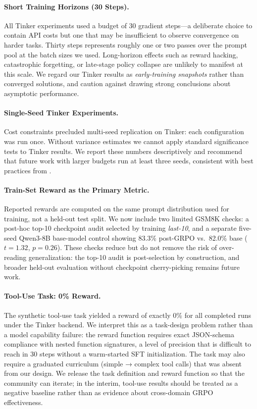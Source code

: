 \documentclass{article}
\begin{document}
\paragraph{Short Training Horizons (30 Steps).}
All Tinker experiments used a budget of 30 gradient steps---a deliberate choice
to contain API costs but one that may be insufficient to observe convergence
on harder tasks. Thirty steps represents roughly one or two passes over the
prompt pool at the batch sizes we used. Long-horizon effects such as reward
hacking, catastrophic forgetting, or late-stage policy collapse are unlikely
to manifest at this scale. We regard our Tinker results as \emph{early-training
snapshots} rather than converged solutions, and caution against drawing strong
conclusions about asymptotic performance.

\paragraph{Single-Seed Tinker Experiments.}
Cost constraints precluded multi-seed replication on Tinker: each configuration
was run once. Without variance estimates we cannot apply standard significance
tests to Tinker results. We report these numbers descriptively and recommend
that future work with larger budgets run at least three seeds, consistent with
best practices from \citet{henderson2018deep}.

\paragraph{Train-Set Reward as the Primary Metric.}
Reported rewards are computed on the same prompt distribution used for
training, not a held-out test split. We now include two limited GSM8K checks:
a post-hoc top-10 checkpoint audit selected by training \emph{last-10}, and a
separate five-seed Qwen3-8B base-model control showing 83.3\% post-GRPO
vs.~82.0\% base ($t = 1.32$, $p = 0.26$). These checks reduce but do not
remove the risk of over-reading generalization: the top-10 audit is
post-selection by construction, and broader held-out evaluation without
checkpoint cherry-picking remains future work.

\paragraph{Tool-Use Task: 0\% Reward.}
The synthetic tool-use task yielded a reward of exactly 0\% for all completed
runs under the Tinker backend. We interpret this as a task-design problem
rather than a model capability failure: the reward function requires exact
JSON-schema compliance with nested function signatures, a level of precision
that is difficult to reach in 30 steps without a warm-started SFT initialization.
The task may also require a graduated curriculum (simple → complex tool calls)
that was absent from our design. We release the task definition and reward
function so that the community can iterate; in the interim, tool-use results
should be treated as a negative baseline rather than as evidence about
cross-domain GRPO effectiveness.
\end{document}
